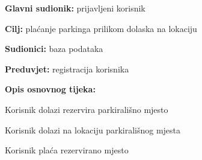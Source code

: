 					\noindent {}
					\begin{packed_item}
						
						
						\item \textbf{Glavni sudionik: }prijavljeni korisnik
						\item  \textbf{Cilj:} plaćanje parkinga prilikom dolaska na lokaciju
						\item  \textbf{Sudionici:} baza podataka
						\item  \textbf{Preduvjet:} registracija korisnika
						\item  \textbf{Opis osnovnog tijeka:}
						
						\item[] \begin{packed_enum}
							
							\item  Korisnik dolazi rezervira parkirališno mjesto
							\item  Korisnik dolazi na lokaciju parkirališnog mjesta
							\item  Korisnik plaća rezervirano mjesto
						\end{packed_enum}
						
					
							
					\end{packed_item}
					
